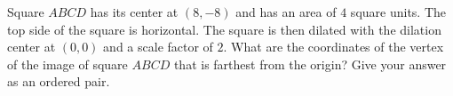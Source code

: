 Square $ABCD$ has its center at $(8,-8)$ and has an area of $4$ square units. The top side of the square is horizontal. The square is then dilated with the dilation center at $(0,0)$ and a scale factor of $2$. What are the coordinates of the vertex of the image of square $ABCD$ that is farthest from the origin? Give your answer as an ordered pair.
